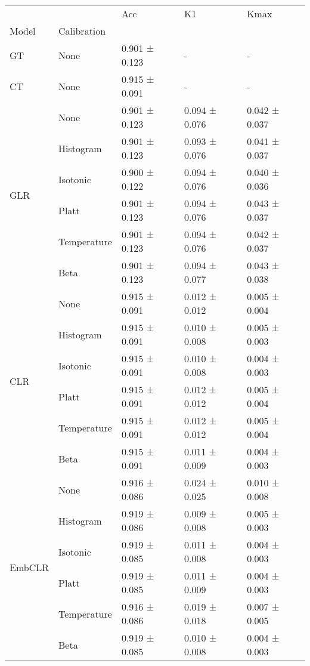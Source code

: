 \begin{tabular}{lllll}
\toprule
 &  & Acc & K1 & Kmax \\
Model & Calibration &  &  &  \\
\midrule
GT & None & 0.901 ± 0.123 & - & - \\
\cline{1-5}
CT & None & 0.915 ± 0.091 & - & - \\
\cline{1-5}
\multirow[t]{6}{*}{GLR} & None & 0.901 ± 0.123 & 0.094 ± 0.076 & 0.042 ± 0.037 \\
 & Histogram & 0.901 ± 0.123 & 0.093 ± 0.076 & 0.041 ± 0.037 \\
 & Isotonic & 0.900 ± 0.122 & 0.094 ± 0.076 & 0.040 ± 0.036 \\
 & Platt & 0.901 ± 0.123 & 0.094 ± 0.076 & 0.043 ± 0.037 \\
 & Temperature & 0.901 ± 0.123 & 0.094 ± 0.076 & 0.042 ± 0.037 \\
 & Beta & 0.901 ± 0.123 & 0.094 ± 0.077 & 0.043 ± 0.038 \\
\cline{1-5}
\multirow[t]{6}{*}{CLR} & None & 0.915 ± 0.091 & 0.012 ± 0.012 & 0.005 ± 0.004 \\
 & Histogram & 0.915 ± 0.091 & 0.010 ± 0.008 & 0.005 ± 0.003 \\
 & Isotonic & 0.915 ± 0.091 & 0.010 ± 0.008 & 0.004 ± 0.003 \\
 & Platt & 0.915 ± 0.091 & 0.012 ± 0.012 & 0.005 ± 0.004 \\
 & Temperature & 0.915 ± 0.091 & 0.012 ± 0.012 & 0.005 ± 0.004 \\
 & Beta & 0.915 ± 0.091 & 0.011 ± 0.009 & 0.004 ± 0.003 \\
\cline{1-5}
\multirow[t]{6}{*}{EmbCLR} & None & 0.916 ± 0.086 & 0.024 ± 0.025 & 0.010 ± 0.008 \\
 & Histogram & 0.919 ± 0.086 & 0.009 ± 0.008 & 0.005 ± 0.003 \\
 & Isotonic & 0.919 ± 0.085 & 0.011 ± 0.008 & 0.004 ± 0.003 \\
 & Platt & 0.919 ± 0.085 & 0.011 ± 0.009 & 0.004 ± 0.003 \\
 & Temperature & 0.916 ± 0.086 & 0.019 ± 0.018 & 0.007 ± 0.005 \\
 & Beta & 0.919 ± 0.085 & 0.010 ± 0.008 & 0.004 ± 0.003 \\
\cline{1-5}
\bottomrule
\end{tabular}
